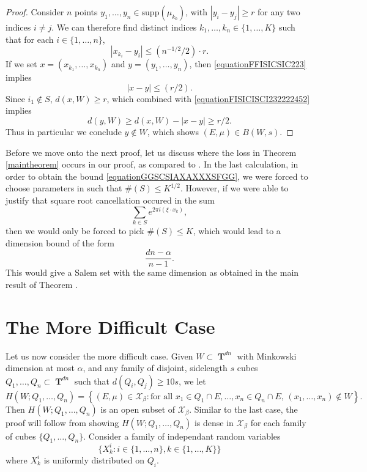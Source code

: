 \documentclass[12pt,reqno]{article}
\numberwithin{equation}{section}
\DeclareMathOperator{\TT}{\mathbf{T}}
\begin{document}
\begin{proof}
    Consider $n$ points $y_1, \dots, y_n \in \text{supp}(\mu_{k_0})$, with $|y_i - y_j| \geq r$ for any two indices $i \neq j$. We can therefore find distinct indices $k_1, \dots, k_n \in \{ 1, \dots, K \}$ such that for each $i \in \{ 1, \dots, n \}$,
    \begin{equation} \label{equationFFISICSIC223}
        |x_{k_i} - y_i| \leq (n^{-1/2}/2) \cdot r.
    \end{equation}
    If we set $x = (x_{k_1}, \dots, x_{k_n})$ and $y = (y_1, \dots, y_n)$, then \eqref{equationFFISICSIC223} implies
    \begin{equation} \label{equationFISICISCI232222452}
        |x - y| \leq (r/2).
    \end{equation}
    Since $i_1 \not \in S$, $d(x,W) \geq r$, which combined with \eqref{equationFISICISCI232222452} implies
    \begin{equation} \label{equationSICSICI}
        d(y,W) \geq d(x,W) - |x - y| \geq r/2.
    \end{equation}
    Thus in particular we conclude $y \not \in W$, which shows $(E,\mu) \in B(W,s)$.
\end{proof}

Before we move onto the next proof, let us discuss where the loss in Theorem \ref{maintheorem} occurs in our proof, as compared to \cite{OurPaper}. In the last calculation, in order to obtain the bound \eqref{equationGGSCSIAXAXXXSFGG}, we were forced to choose parameters in such that $\#(S) \leq K^{1/2}$. However, if we were able to justify that square root cancellation occured in the sum
%
\[ \sum_{k \in S} e^{2 \pi i (\xi \cdot x_k)}, \]
%
then we would only be forced to pick $\#(S) \leq K$, which would lead to a dimension bound of the form
%
\[ \frac{dn - \alpha}{n - 1}. \]
%
This would give a Salem set with the same dimension as obtained in the main result of Theorem \cite{OurPaper}.

\section{The More Difficult Case}

Let us now consider the more difficult case. Given $W \subset \TT^{dn}$ with Minkowski dimension at most $\alpha$, and any family of disjoint, sidelength $s$ cubes $Q_1,\dots,Q_n \subset \TT^{dn}$ such that $d(Q_i,Q_j) \geq 10s$, we let
%
\[ H(W;Q_1,\dots,Q_n) = \left\{ (E,\mu) \in \mathcal{X}_\beta: \text{for all $x_1 \in Q_1 \cap E, \dots, x_n \in Q_n \cap E$, $(x_1,\dots, x_n) \not \in W$} \right\}. \]
%
Then $H(W;Q_1,\dots,Q_n)$ is an open subset of $\mathcal{X}_\beta$. Similar to the last case, the proof will follow from showing $H(W;Q_1,\dots,Q_n)$ is dense in $\mathcal{X}_\beta$ for each family of cubes $\{ Q_1,\dots, Q_n \}$. Consider a family of independant random variables
%
\[ \{ X^i_k : i \in \{ 1, \dots, n \}, k \in \{ 1, \dots, K \} \} \]
%
where $X^i_k$ is uniformly distributed on $Q_i$.
\end{document}
